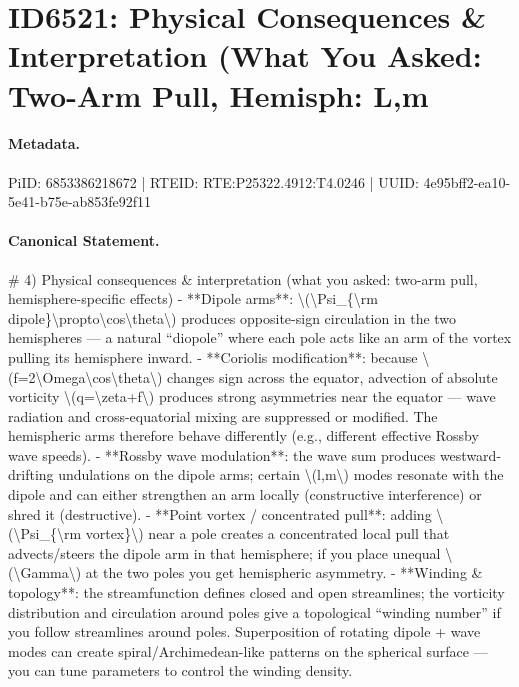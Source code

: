 \section*{ID6521: Physical Consequences \& Interpretation (What You Asked: Two-Arm Pull, Hemisph: L,m}
\paragraph{Metadata.}
PiID: 6853386218672 | RTEID: RTE:P25322.4912:T4.0246 | UUID: 4e95bff2-ea10-5e41-b75e-ab853fe92f11

\paragraph{Canonical Statement.}
\# 4) Physical consequences \& interpretation (what you asked: two-arm pull, hemisphere-specific effects) - **Dipole arms**: \textbackslash{}(\textbackslash{}Psi\_\{\textbackslash{}rm dipole\}\textbackslash{}propto\textbackslash{}cos\textbackslash{}theta\textbackslash{}) produces opposite-sign circulation in the two hemispheres — a natural “diopole” where each pole acts like an arm of the vortex pulling its hemisphere inward. - **Coriolis modification**: because \textbackslash{}(f=2\textbackslash{}Omega\textbackslash{}cos\textbackslash{}theta\textbackslash{}) changes sign across the equator, advection of absolute vorticity \textbackslash{}(q=\textbackslash{}zeta+f\textbackslash{}) produces strong asymmetries near the equator — wave radiation and cross-equatorial mixing are suppressed or modified. The hemispheric arms therefore behave differently (e.g., different effective Rossby wave speeds). - **Rossby wave modulation**: the wave sum produces westward-drifting undulations on the dipole arms; certain \textbackslash{}(l,m\textbackslash{}) modes resonate with the dipole and can either strengthen an arm locally (constructive interference) or shred it (destructive). - **Point vortex / concentrated pull**: adding \textbackslash{}(\textbackslash{}Psi\_\{\textbackslash{}rm vortex\}\textbackslash{}) near a pole creates a concentrated local pull that advects/steers the dipole arm in that hemisphere; if you place unequal \textbackslash{}(\textbackslash{}Gamma\textbackslash{}) at the two poles you get hemispheric asymmetry. - **Winding \& topology**: the streamfunction defines closed and open streamlines; the vorticity distribution and circulation around poles give a topological “winding number” if you follow streamlines around poles. Superposition of rotating dipole + wave modes can create spiral/Archimedean-like patterns on the spherical surface — you can tune parameters to control the winding density.

